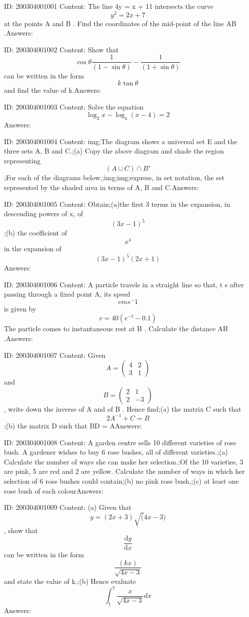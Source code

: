 \documentclass{article}
\begin{document}
ID: 200304001001
Content:
The line 4y = x + 11 intersects the curve $$y^2=2x+7$$ at the points A and B . Find the coordinates of the mid-point of the line AB .Answers:

ID: 200304001002
Content:
Show that $$\cos\theta\frac{1}{(1-\sin \theta)}-\frac{1}{(1+\sin \theta)}$$ can be written in the form $$k \tan \theta$$ and find the value of k.Answers:

ID: 200304001003
Content:
Solve the equation $$\log_2x-\log_4(x-4)=2$$Answers:

ID: 200304001004
Content:
img;The diagram shows a universal set E and the three sets A, B and C.;(a)	Copy the above diagram and shade the region representing $$(A \cup C)\cap B'$$;For each of the diagrams below,;img;img;express, in set notation, the set represented by the shaded area in terms of A, B and C.Answers:

ID: 200304001005
Content:
Obtain;(a)the first 3 terms in the expansion, in descending powers of x, of $$(3x-1)^5$$;(b) the coefficient of $$x^4$$ in the expansion of $$(3x-1)^5(2x+1)$$Answers:

ID: 200304001006
Content:
A particle travels in a straight line so that, t s after passing through a fixed point A, its speed $$vms^-1$$ is given by $$v=40(e^{-t}-0.1)$$ The particle comes to instantaneous rest at B . Calculate the distance AB .Answers:

ID: 200304001007
Content:
Given $$A=\begin{pmatrix}4 & 2\\  3& 1\end{pmatrix}$$ and $$B=\begin{pmatrix}2 & 1\\  2& -3\end{pmatrix}$$, write down the inverse of A and of B . Hence find;(a)	the matrix C such that $$2A^{-1}+C=B$$;(b)	the matrix D such that BD = AAnswers:

ID: 200304001008
Content:
A garden centre sells 10 different varieties of rose bush. A gardener wishes to buy 6 rose bushes, all of different varieties.;(a)	Calculate the number of ways she can make her selection.;Of the 10 varieties, 3 are pink, 5 are red and 2 are yellow. Calculate the number of ways in which her selection of 6 rose bushes could contain;(b)	no pink rose bush,;(c)	at least one rose bush of each colourAnswers:

ID: 200304001009
Content:
(a)	Given that $$y=(2x+3)\sqrt(4x-3)$$, show that $$ \frac{\mathrm{d} y}{\mathrm{d} x}$$ can be written in the form $$\frac{(kx)}{\sqrt{4x-3}}$$ and state the value of k.;(b)	Hence evaluate $$\int_1^7 \frac{x}{\sqrt{4x-3}}dx$$Answers:
\end{document}
